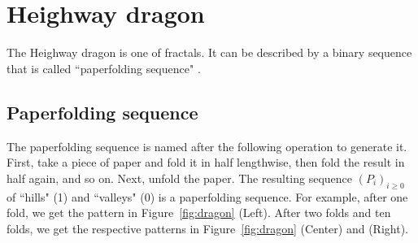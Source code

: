 \documentclass[runningheads,a4]{llncs}
\begin{document}
\section{Heighway dragon}

The Heighway dragon is one of fractals.
It can be described by a binary sequence that is called ``paperfolding sequence" \cite{automatic}.

\subsection{Paperfolding sequence}
The paperfolding sequence is named after the following operation to generate it.
First, take a piece of paper and fold it in half lengthwise, then fold the result in half again, and so on.
Next, unfold the paper.
The resulting sequence $(P_i)_{i\geq0}$ of ``hills" (1) and ``valleys" (0) is a paperfolding sequence.
For example,  after one fold, we get the pattern in Figure~\ref{fig:dragon} (Left).
After two folds and ten folds, we get the respective patterns in Figure~\ref{fig:dragon} (Center) and (Right).
\end{document}
